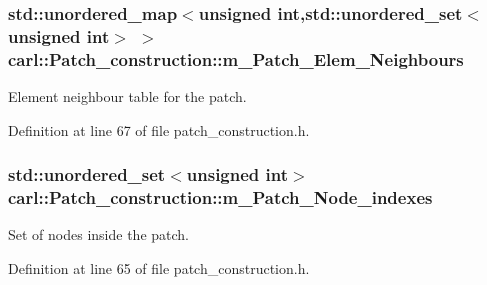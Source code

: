 \hypertarget{classcarl_1_1_patch__construction_a47c4343835537781c48813feed01e60e}{}
\subsubsection[{m\+\_\+\+Patch\+\_\+\+Elem\+\_\+\+Neighbours}]{\setlength{\rightskip}{0pt plus 5cm}std\+::unordered\+\_\+map$<$unsigned int,std\+::unordered\+\_\+set$<$unsigned int$>$ $>$ carl\+::\+Patch\+\_\+construction\+::m\+\_\+\+Patch\+\_\+\+Elem\+\_\+\+Neighbours\hspace{0.3cm}{\ttfamily [protected]}}\label{classcarl_1_1_patch__construction_a47c4343835537781c48813feed01e60e}


Element neighbour table for the patch. 



Definition at line 67 of file patch\+\_\+construction.\+h.

\hypertarget{classcarl_1_1_patch__construction_a85fb959e6f57d935a8d6fe0d4f0f7f46}{}
\subsubsection[{m\+\_\+\+Patch\+\_\+\+Node\+\_\+indexes}]{\setlength{\rightskip}{0pt plus 5cm}std\+::unordered\+\_\+set$<$unsigned int$>$ carl\+::\+Patch\+\_\+construction\+::m\+\_\+\+Patch\+\_\+\+Node\+\_\+indexes\hspace{0.3cm}{\ttfamily [protected]}}\label{classcarl_1_1_patch__construction_a85fb959e6f57d935a8d6fe0d4f0f7f46}


Set of nodes inside the patch. 



Definition at line 65 of file patch\+\_\+construction.\+h.

\hypertarget{classcarl_1_1_patch__construction_abb348e12e9fb16cb426e68127ec02c95}{}

